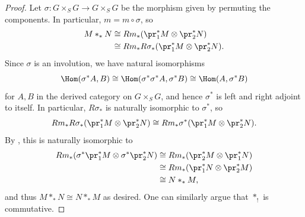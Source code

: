 \begin{proof}
    Let $\sigma: G \times_S G \to G \times_S G$ be the morphism given by permuting the components. In particular, $m = m \circ \sigma$, so
    \begin{align*}
        M *_* N &\cong Rm_* (\pr_1^* M \otimes \pr_2^* N) \\
        &\cong Rm_* R\sigma_* (\pr_1^* M \otimes \pr_2^* N).
    \end{align*}
    Since $\sigma$ is an involution, we have natural isomorphisms
    $$\Hom(\sigma^* A, B) \cong \Hom(\sigma^* \sigma^* A, \sigma^* B) \cong \Hom(A, \sigma^* B)$$
    for $A, B$ in the derived category on $G \times_S G$, and hence $\sigma^*$ is left and right adjoint to itself. In particular, $R\sigma_*$ is naturally isomorphic to $\sigma^*$, so
    $$Rm_* R\sigma_* (\pr_1^* M \otimes \pr_2^* N) \cong Rm_* \sigma^* (\pr_1^* M \otimes \pr_2^* N).$$
    By , this is naturally isomorphic to
    \begin{align*}
        Rm_* (\sigma^* \pr_1^* M \otimes \sigma^* \pr_2^* N) &\cong Rm_*(\pr_2^* M \otimes \pr_1^* N) \\
        &\cong Rm_*(\pr_1^* N \otimes \pr_2^* M) \\
        &\cong N *_* M,
    \end{align*}
    and thus $M *_* N \cong N *_* M$ as desired. One can similarly argue that $*_!$ is commutative.
\end{proof}
